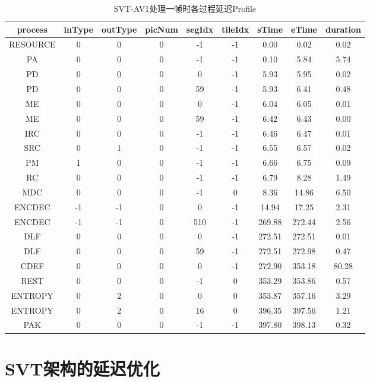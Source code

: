   \begin{table}[!hpt]
    \renewcommand{\arraystretch}{0.8} %
    \caption{SVT-AV1处理一帧时各过程延迟Profile}
    \label{tab:svt-profile}
    \centering
    \begin{tabular}{ccccccccc} \toprule
      process & inType & outType & picNum & segIdx & tileIdx & sTime & eTime & duration\\ \midrule
      RESOURCE & 0 & 0 & 0 & -1 & -1 & 0.00 & 0.02 & 0.02 \\
      PA & 0 & 0 & 0 & -1 & -1 & 0.10 & 5.84 & 5.74 \\
      PD & 0 & 0 & 0 & 0 & -1 & 5.93 & 5.95 & 0.02 \\
      PD & 0 & 0 & 0 & 59 & -1 & 5.93 & 6.41 & 0.48 \\
      ME & 0 & 0 & 0 & 0 & -1 & 6.04 & 6.05 & 0.01 \\
      ME & 0 & 0 & 0 & 59 & -1 & 6.42 & 6.43 & 0.00 \\
      IRC & 0 & 0 & 0 & -1 & -1 & 6.46 & 6.47 & 0.01 \\
      SRC & 0 & 1 & 0 & -1 & -1 & 6.55 & 6.57 & 0.02 \\
      PM & 1 & 0 & 0 & -1 & -1 & 6.66 & 6.75 & 0.09 \\
      RC & 0 & 0 & 0 & -1 & -1 & 6.79 & 8.28 & 1.49 \\
      MDC & 0 & 0 & 0 & -1 & 0 & 8.36 & 14.86 & 6.50 \\
      ENCDEC & -1 & -1 & 0 & 0 & -1 & 14.94 & 17.25 & 2.31 \\
      ENCDEC & -1 & -1 & 0 & 510 & -1 & 269.88 & 272.44 & 2.56 \\
      DLF & 0 & 0 & 0 & 0 & -1 & 272.51 & 272.51 & 0.01 \\
      DLF & 0 & 0 & 0 & 59 & -1 & 272.51 & 272.98 & 0.47 \\
      CDEF & 0 & 0 & 0 & 0 & -1 & 272.90 & 353.18 & 80.28 \\
      REST & 0 & 0 & 0 & -1 & 0 & 353.29 & 353.86 & 0.57 \\
      ENTROPY & 0 & 2 & 0 & 0 & 0 & 353.87 & 357.16 & 3.29 \\
      ENTROPY & 0 & 2 & 0 & 16 & 0 & 396.35 & 397.56 & 1.21 \\
      PAK & 0 & 0 & 0 & -1 & -1 & 397.80 & 398.13 & 0.32\\ \bottomrule
    \end{tabular}
  \end{table}

\section{SVT架构的延迟优化}
